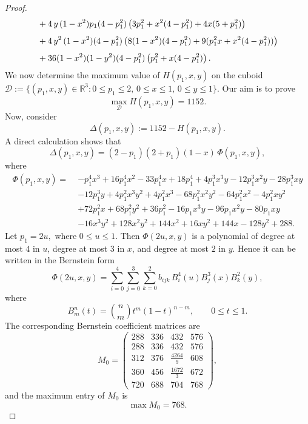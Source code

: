 \documentclass[10pt,a4paper]{amsart}
\begin{document}
\begin{proof}
\begin{align}
			& + 4\, y\,(1 - x^{2}) p_{1}(4 - p_{1}^{2})
			\left(3 p_{1}^{2} + x^{2}(4 - p_{1}^{2}) + 4x(5 + p_{1}^{2})\right) \notag\\[4pt]
			& + 4\,y^{2}\,(1 - x^{2})(4 - p_{1}^{2})
			\left(8(1 - x^{2})(4 - p_{1}^{2})
			+ 9(p_{1}^{2}x + x^{2}(4 - p_{1}^{2}))\right) \notag\\[4pt]
			& + 36(1 - x^{2})(1 - y^{2})(4 - p_{1}^{2})
			\left(p_{1}^{2} + x(4 - p_{1}^{2})\right).
		\end{align}
		We now determine the maximum value of \(H(p_{1},x,y)\) on the cuboid
		$
		\mathcal{D}:=\{(p_1, x, y)\in \mathbb{R}^3: 0\le p_{1}\le 2,\, 0\le x\le 1,\, 0\le y\le 1\}.
		$
		Our aim is to prove 
		\[
		\max_{\mathcal{D}} H(p_{1},x,y)=1152.
		\]
		Now, consider
		\[
		\Delta(p_{1},x,y):=1152-H(p_{1},x,y).
		\]
		A direct calculation shows that
		\[
		\Delta(p_{1},x,y)
		=(2-p_{1})(2+p_{1})(1-x)\,\Phi(p_{1},x,y),
		\]
		where
		\[
		\begin{aligned}
			\Phi(p_{1},x,y)=\;&
			-p_{1}^{4}x^{3}+16p_{1}^{4}x^{2}-33p_{1}^{4}x+18p_{1}^{4} +4p_{1}^{3}x^{3}y-12p_{1}^{3}x^{2}y-28p_{1}^{3}xy\\
			&-12p_{1}^{3}y +4p_{1}^{2}x^{3}y^{2}+4p_{1}^{2}x^{3}-68p_{1}^{2}x^{2}y^{2}-64p_{1}^{2}x^{2} -4p_{1}^{2}xy^{2}\\
			&+72p_{1}^{2}x+68p_{1}^{2}y^{2}+36p_{1}^{2}-16p_{1}x^{3}y-96p_{1}x^{2}y-80p_{1}xy \\
			&-16x^{3}y^{2}+128x^{2}y^{2}+144x^{2}+16xy^{2}+144x-128y^{2}+288 .
		\end{aligned}
		\]
		Let
		$
		p_{1}=2u,$  where $0\le u\le 1.
		$
		Then \(\Phi(2u,x,y)\) is a polynomial of degree at most \(4\) in \(u\), degree at most \(3\) in \(x\), and degree at most \(2\) in \(y\). Hence it can be written in the Bernstein form
		\[
		\Phi(2u,x,y)
		=
		\sum_{i=0}^{4}\sum_{j=0}^{3}\sum_{k=0}^{2}
		b_{ijk}\,B_{i}^{4}(u)B_{j}^{3}(x)B_{k}^{2}(y),
		\]
		where
		\[
		B_{m}^{n}(t)=\binom{n}{m}t^{m}(1-t)^{n-m},\qquad 0\le t\le 1.
		\]
		The corresponding Bernstein coefficient matrices are
		\[
		M_{0}=
		\begin{pmatrix}
			288&336&432&576\\[3mm]
			288&336&432&576\\[3mm]
			312&376&\frac{4264}{9}&608\\[3mm]
			360&456&\frac{1672}{3}&672\\[3mm]
			720&688&704&768
		\end{pmatrix},
		\]
		and the maximum entry of \(M_{0}\) is
		\[
		\max M_{0}=768.
		\]
		

\end{proof}
\end{document}
